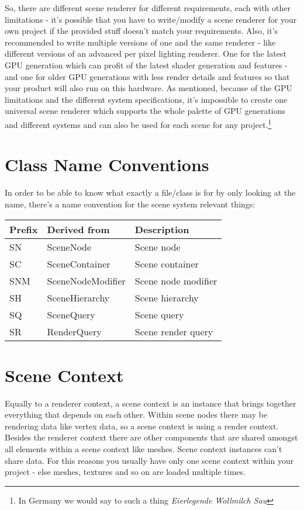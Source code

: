 So, there are different scene renderer for different requirements, each with other limitations - it's possible that you have to write/modify a scene renderer for your own project if the provided stuff doesn't match your requirements. Also, it's recommended to write multiple versions of one and the same renderer - like different versions of an advanced per pixel lighting renderer. One for the latest GPU generation which can profit of the latest shader generation and features - and one for older GPU generations with less render details and features so that your product will also run on this hardware. As mentioned, because of the GPU limitations and the different system specifications, it's impossible to create one universal scene renderer which supports the whole palette of GPU generations and different systems and can also be used for each scene for any project.\footnote{In Germany we would say to such a thing \emph{Eierlegende Wollmilch Sau}}




\section{Class Name Conventions}
In order to be able to know what exactly a file/class is for by only looking at the name, there's a name convention for the scene system relevant things:

\begin{tabular}{|p{2cm}|p{5cm}|p{7cm}|}
\hline
\textbf{Prefix} & \textbf{Derived from} & \textbf{Description}\\
\hline
SN  & SceneNode         & Scene node\\
\hline
SC  & SceneContainer    & Scene container\\
\hline
SNM & SceneNodeModifier & Scene node modifier \\
\hline
SH  & SceneHierarchy    & Scene hierarchy\\
\hline
SQ  & SceneQuery        & Scene query\\
\hline
SR  & RenderQuery       & Scene render query\\
\hline
\end{tabular}




\section{Scene Context}
Equally to a renderer context, a scene context is an instance that brings together everything that depends on each other. Within scene nodes there may be rendering data like vertex data, so a scene context is using a render context. Besides the renderer context there are other components that are shared amongst all elements within a scene context like meshes. Scene context instances can't share data. For this reasons you usually have only one scene context within your project - else meshes, textures and so on are loaded multiple times.




